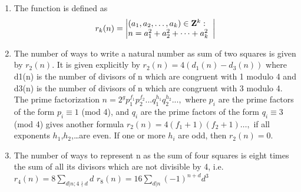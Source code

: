 \begin{enumerate}[resume]
    \item The function is defined as
    \[
r_k(n)
=
\left|
\begin{array}{@{}l}
(a_1,a_2,\dots,a_k) \in \mathbf{Z}^k : \\
n = a_1^2 + a_2^2 + \dots + a_k^2
\end{array}
\right|
\]
    \item The number of ways to write a natural number as sum of two squares is given by $r_2(n)$. It is given explicitly by
    $r_{2}\left(n\right) = 4\left(d_{1}\left(n\right) - d_{3}\left(n\right)\right)$
    where d1(n) is the number of divisors of n which are congruent with 1 modulo 4 and d3(n) is the number of divisors of n which are congruent with 3 modulo 4.
    The prime factorization $n = 2^{g}p_{1}^{f_{1}}p_{2}^{f_{2}}. . .q_{1}^{h_{1}}q_{2}^{h_{2}}. . . ,$ where $\displaystyle p_{i}$ are the prime factors of the form $\displaystyle p_{i} \equiv 1$ (mod 4), and $q_{i}$ are the prime factors of the form $q_{i} \equiv 3$ (mod 4) gives another formula $r_{2}\left(n\right) = 4\left(f_{1}+1\right)\left(f_{2}+1\right)\dots,$ if all exponents $h_{1}$,$h_{2}$,\dots are even. If one or more $h_{i}$ are odd, then $r_{2}\left(n\right) = 0.$
    \item The number of ways to represent n as the sum of four squares is eight times the sum of all its divisors which are not divisible by 4, i.e.
    $r_{4}\left( n \right) = 8 \displaystyle\sum _{d| n;4 \nmid d}d$
    $r_{8}\left(n\right) = 16 \displaystyle\sum _{d|n} \left(-1\right)^{n+d}d^{3}$
\end{enumerate}
